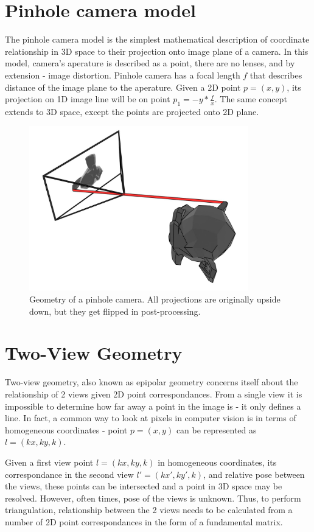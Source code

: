 \documentclass[11pt,english]{report}
\begin{document}
\section{Pinhole camera model}

The pinhole camera model is the simplest mathematical description of coordinate relationship in 3D space to their projection onto image plane of a camera. In this model, camera's aperature is described as a point, there are no lenses, and by extension - image distortion. Pinhole camera has a focal length $f$ that describes distance of the image plane to the aperature. Given a 2D point $p = (x, y)$, its projection on 1D image line will be on point $p_1 = -y * \frac{f}{x}$. The same concept extends to 3D space, except the points are projected onto 2D plane.

\begin{figure}[!ht]
	\centering
	\includegraphics[width=270pt]{docs/report/pinhole-camera.jpg}
	\caption{\centering Geometry of a pinhole camera. All projections are originally upside down, but they get flipped in post-processing.}
\end{figure}

\section{Two-View Geometry}

Two-view geometry, also known as epipolar geometry concerns itself about the relationship of 2 views given 2D point correspondances. From a single view it is impossible to determine how far away a point in the image is - it only defines a line. In fact, a common way to look at pixels in computer vision is in terms of homogeneous coordinates - point $p = (x, y)$ can be represented as $l = (kx, ky, k)$.

Given a first view point $l = (kx, ky, k)$ in homogeneous coordinates, its correspondance in the second view $l' = (kx', ky', k)$, and relative pose between the views, these points can be intersected and a point in 3D space may be resolved. However, often times, pose of the views is unknown. Thus, to perform triangulation, relationship between the 2 views needs to be calculated from a number of 2D point correspondances in the form of a fundamental matrix.
\end{document}

